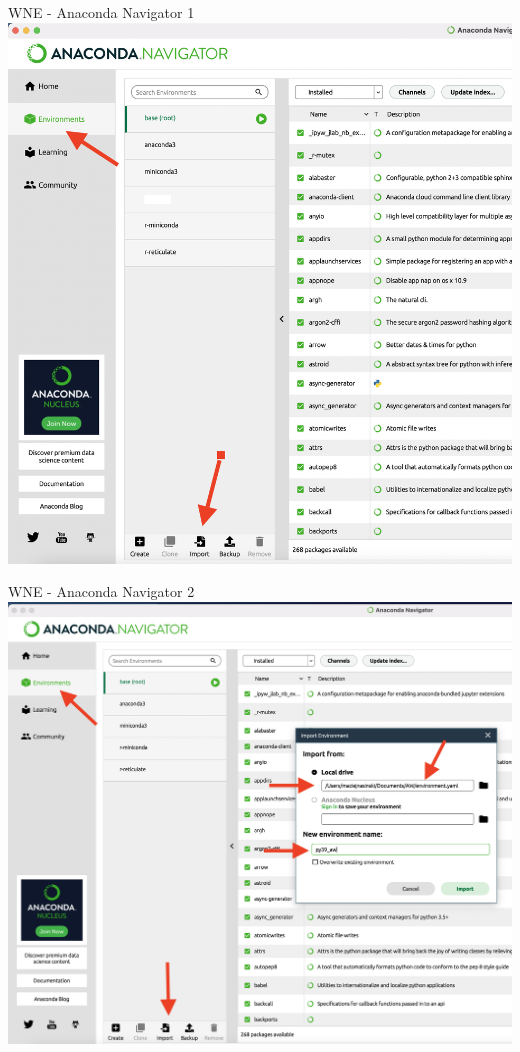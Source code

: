 \documentclass{beamer}
\begin{document}
\begin{frame}{WNE - Anaconda Navigator 1}
  \includegraphics[scale = 0.20]{anaconda_navigator_1.png}
\end{frame}

\begin{frame}{WNE - Anaconda Navigator 2}
  \includegraphics[scale = 0.20]{anaconda_navigator_2.png}
\end{frame}
\end{document}

